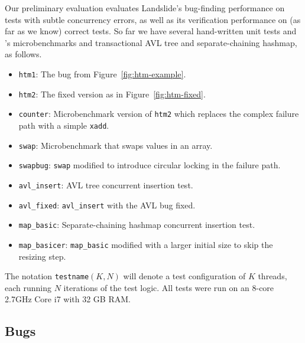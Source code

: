 \documentclass{article}
\begin{document}
Our preliminary evaluation evaluates Landslide's bug-finding performance on tests with subtle concurrency errors,
as well as its verification performance on (as far as we know) correct tests.
So far we have several hand-written unit tests
and \cite{htm-mario}'s microbenchmarks and transactional AVL tree and separate-chaining hashmap,
as follows.

\begin{itemize}
	\item {\tt htm1}: The bug from Figure~\ref{fig:htm-example}. %
	\item {\tt htm2}: The fixed version as in Figure~\ref{fig:htm-fixed}.
	\item {\tt counter}: Microbenchmark version of {\tt htm2} which replaces the complex failure path with a simple {\tt xadd}.
	\item {\tt swap}: Microbenchmark that swaps values in an array.
	\item {\tt swapbug}: {\tt swap} modified to introduce circular locking in the failure path. %
	\item {\tt avl\_insert}: AVL tree concurrent insertion test.
	\item {\tt avl\_fixed}: {\tt avl\_insert} with the AVL bug fixed. %
	\item {\tt map\_basic}: Separate-chaining hashmap concurrent insertion test.
	\item {\tt map\_basicer}: {\tt map\_basic} modified with a larger initial size to skip the resizing step.
\end{itemize}

The notation {\tt testname}$(K,N)$ will denote a test configuration of $K$ threads, each running $N$ iterations of the test logic.
All tests were run on an 8-core 2.7GHz Core i7 with 32 GB RAM.

\subsection{Bugs}
\end{document}
